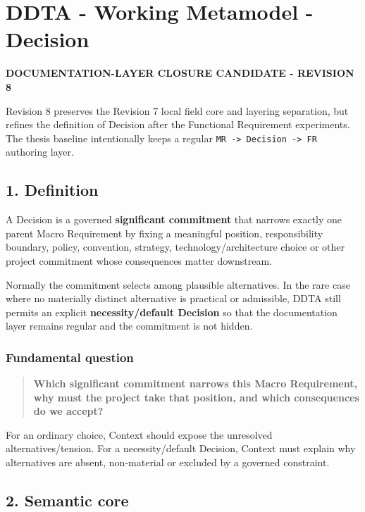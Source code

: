 \documentclass[
  10pt,
]{article}
\author{}
\date{}
\begin{document}
\section{DDTA - Working Metamodel -
Decision}\label{ddta---working-metamodel---decision}

\textbf{DOCUMENTATION-LAYER CLOSURE CANDIDATE - REVISION 8}

Revision 8 preserves the Revision 7 local field core and layering
separation, but refines the definition of Decision after the Functional
Requirement experiments. The thesis baseline intentionally keeps a
regular \texttt{MR\ -\textgreater{}\ Decision\ -\textgreater{}\ FR}
authoring layer.

\subsection{1. Definition}\label{1-definition}

A Decision is a governed \textbf{significant commitment} that narrows
exactly one parent Macro Requirement by fixing a meaningful position,
responsibility boundary, policy, convention, strategy,
technology/architecture choice or other project commitment whose
consequences matter downstream.

Normally the commitment selects among plausible alternatives. In the
rare case where no materially distinct alternative is practical or
admissible, DDTA still permits an explicit \textbf{necessity/default
Decision} so that the documentation layer remains regular and the
commitment is not hidden.

\subsubsection{Fundamental question}\label{fundamental-question}

\begin{quote}
\textbf{Which significant commitment narrows this Macro Requirement, why
must the project take that position, and which consequences do we
accept?}
\end{quote}

For an ordinary choice, Context should expose the unresolved
alternatives/tension. For a necessity/default Decision, Context must
explain why alternatives are absent, non-material or excluded by a
governed constraint.

\subsection{2. Semantic core}\label{2-semantic-core}
\end{document}
